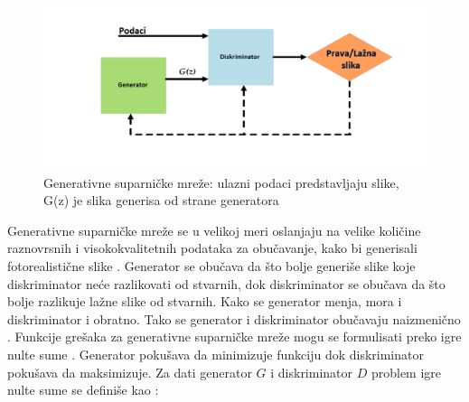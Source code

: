 \documentclass[12pt,oneside]{memoir}
\begin{document}
\begin{figure}[ht]
    \centering
    \includegraphics[width=1\textwidth]{matfmaster/glava2/gans_cus.png}
    \caption{Generativne suparničke mreže: ulazni podaci predstavljaju slike, G(z) je  slika generisa od strane generatora \cite{gans_image}}
    \label{fig:section2_gans}
\end{figure}

Generativne suparničke mreže se u velikoj meri oslanjaju na velike količine raznovrsnih i visokokvalitetnih podataka za obučavanje, kako bi generisali fotorealistične slike \cite{zhao2020differentiable}. 
Generator se obučava da što bolje generiše slike koje diskriminator neće razlikovati od stvarnih, dok diskriminator se obučava da što bolje razlikuje lažne slike od stvarnih. Kako se generator menja, mora i diskriminator i obratno. Tako se generator i diskriminator obučavaju naizmenično \cite{ml2019}. 
Funkcije grešaka za generativne suparničke mreže mogu se formulisati preko igre nulte sume \cite{goodfellow2020generative, hodgson2006microeconomics}. Generator pokušava da minimizuje funkciju dok diskriminator pokušava da maksimizuje. Za dati generator $G$ i diskriminator $D$ problem igre nulte sume se definiše kao \cite{goodfellow2020generative, ml2019}:
\end{document}
